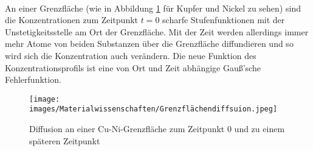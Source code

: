 \documentclass[11pt,a4paper]{article}
\numberwithin{equation}{section}
\numberwithin{figure}{section}
\begin{document}
\\
\begin{addmargin}[25pt]{0pt}
An einer Grenzfläche (wie in Abbildung \ref{fig:grenzflächendiffusion} für Kupfer und Nickel zu sehen) sind die Konzentrationen zum Zeitpunkt $t = 0$ scharfe Stufenfunktionen mit der Unstetigkeitsstelle am Ort der Grenzfläche. Mit der Zeit werden allerdings immer mehr Atome von beiden Substanzen über die Grenzfläche diffundieren und so wird sich die Konzentration auch verändern. Die neue Funktion des Konzentrationsprofils ist eine von Ort und Zeit abhängige Gauß'sche Fehlerfunktion. \\

\begin{figure}[h]
    \centering
    \texttt{[image: images/Materialwissenschaften/Grenzflächendiffsuion.jpeg]}
    \caption{Diffusion an einer Cu-Ni-Grenzfläche zum Zeitpunkt 0 und zu einem späteren Zeitpunkt }
    \label{fig:grenzflächendiffusion}
\end{figure}
\end{addmargin} 
\end{document}
